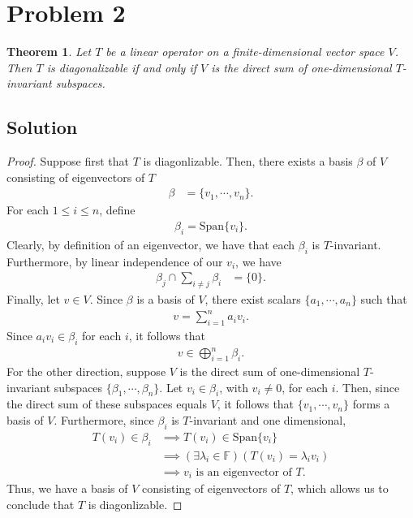 \documentclass[10pt,a4paper]{article}
\newtheorem{theorem}{Theorem}
\theoremstyle{definition}
\begin{document}
\section*{Problem 2}
\begin{theorem}
Let $T$ be a linear operator on a finite-dimensional vector space $V$. Then $T$ is diagonalizable if and only if $V$ is the direct sum of one-dimensional $T$-invariant subspaces.
\end{theorem}

\subsection*{Solution}
\begin{proof}
Suppose first that $T$ is diagonlizable. Then, there exists a basis $\beta$ of $V$ consisting of eigenvectors of $T$
\begin{align*}
\beta &= \{v_1, \cdots, v_n \}.
\end{align*}
For each $1 \leq i \leq n$, define 
\begin{align*}
\beta_i = \text{Span} \{v_i \}.
\end{align*}
Clearly, by definition of an eigenvector, we have that each $\beta_i$ is $T$-invariant. Furthermore, by linear independence of our $v_i$, we have
\begin{align*}
\beta_j \cap \sum_{i \not= j} \beta_i &= \{0 \}.
\end{align*}
Finally, let $v \in V$. Since $\beta$ is a basis of $V$, there exist scalars $\{a_1, \cdots, a_n\}$ such that
\begin{align*}
v = \sum_{i = 1}^n a_i v_i.
\end{align*}
Since $a_i v_i \in \beta_i$ for each $i$, it follows that 
\begin{align*}
v \in \bigoplus_{i=1}^n \beta_i.
\end{align*}
For the other direction, suppose $V$ is the direct sum of one-dimensional $T$-invariant subspaces $\{\beta_1, \cdots, \beta_n\}$. Let $v_i \in \beta_i$, with $v_i \not = 0$, for each $i$. Then, since the direct sum of these subspaces equals $V$, it follows that $\{v_1, \cdots, v_n \}$ forms a basis of $V$. Furthermore, since $\beta_i$ is $T$-invariant and one dimensional,
\begin{align*}
T(v_i) \in \beta_i &\implies T(v_i) \in \text{Span} \{v_i\}\\
&\implies (\exists \lambda_i \in \mathbb{F})(T(v_i) = \lambda_i v_i)\\
&\implies v_i \text{ is an eigenvector of } T.
\end{align*}
Thus, we have a basis of $V$ consisting of eigenvectors of $T$, which allows us to conclude that $T$ is diagonlizable.
\end{proof}
\end{document}
